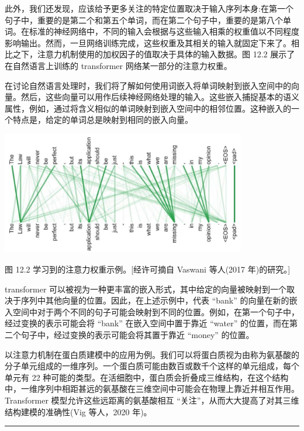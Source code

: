 \documentclass[10pt]{article}
\newcommand{\HRule}{\begin{center}\rule{0.9\linewidth}{0.2mm}\end{center}}
\begin{document}
此外，我们还发现，应该给予更多关注的特定位置取决于输入序列本身:在第一个句子中，重要的是第二个和第五个单词，而在第二个句子中，重要的是第八个单词。在标准的神经网络中，不同的输入会根据与这些输入相乘的权重值以不同程度影响输出。然而，一旦网络训练完成，这些权重及其相关的输入就固定下来了。相比之下，注意力机制使用的加权因子的值取决于具体的输入数据。图 12.2 展示了在自然语言上训练的 transformer 网络某一部分的注意力权重。

在讨论自然语言处理时，我们将了解如何使用词嵌入将单词映射到嵌入空间中的向量。然后，这些向量可以用作后续神经网络处理的输入。这些嵌入捕捉基本的语义属性，例如，通过将含义相似的单词映射到嵌入空间中的相邻位置。这种嵌入的一个特点是，给定的单词总是映射到相同的嵌入向量。

\begin{center}
\includegraphics[max width=0.8\textwidth]{images/0194e279-9b28-703a-88f4-c3ac21e2010d_379_375_354_1067_539_0.jpg}
\end{center}
\hspace*{3em} 

图 12.2 学习到的注意力权重示例。[经许可摘自 Vaswani 等人(2017 年)的研究。]

transformer 可以被视为一种更丰富的嵌入形式，其中给定的向量被映射到一个取决于序列中其他向量的位置。因此，在上述示例中，代表 “bank” 的向量在新的嵌入空间中对于两个不同的句子可能会映射到不同的位置。例如，在第一个句子中，经过变换的表示可能会将 “bank” 在嵌入空间中置于靠近 “water” 的位置，而在第二个句子中，经过变换的表示可能会将其置于靠近 “money” 的位置。

以注意力机制在蛋白质建模中的应用为例。我们可以将蛋白质视为由称为氨基酸的分子单元组成的一维序列。一个蛋白质可能由数百或数千个这样的单元组成，每个单元有 22 种可能的类型。在活细胞中，蛋白质会折叠成三维结构，在这个结构中，一维序列中相距甚远的氨基酸在三维空间中可能会在物理上靠近并相互作用。Transformer 模型允许这些远距离的氨基酸相互 “关注”，从而大大提高了对其三维结构建模的准确性(Vig 等人，2020 年)。

\HRule
\end{document}
